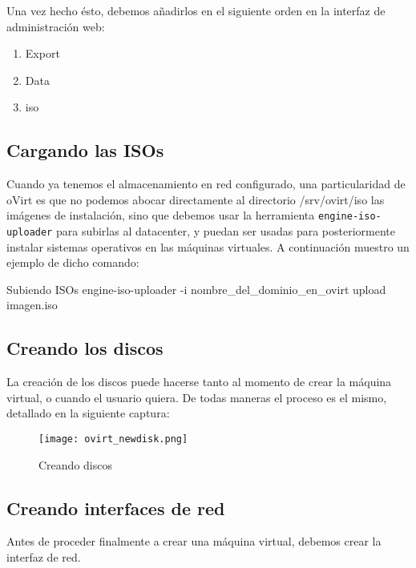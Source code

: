 Una vez hecho ésto, debemos añadirlos en el siguiente orden en la interfaz de administración web:

\begin{enumerate}
    \item Export
    \item Data
    \item iso
\end{enumerate}

\subsection{Cargando las ISOs}
\label{subsec:isos}

Cuando ya tenemos el almacenamiento en red configurado, una particularidad de oVirt es que no podemos abocar directamente al directorio /srv/ovirt/iso las imágenes de instalación, sino que debemos usar la herramienta \texttt{engine-iso-uploader} para subirlas al datacenter, y puedan ser usadas para posteriormente instalar sistemas operativos en las máquinas virtuales. A continuación muestro un ejemplo de dicho comando:

\begin{TMterminal}{}{}{Subiendo ISOs}
  engine-iso-uploader -i nombre_del_dominio_en_ovirt upload imagen.iso
\end{TMterminal}

\subsection{Creando los discos}
\label{subsec:creando_discos}

La creación de los discos puede hacerse tanto al momento de crear la máquina virtual, o cuando el usuario quiera. De todas maneras el proceso es el mismo, detallado en la siguiente captura: 

\begin{figure}[ht!]
  \centering
  \texttt{[image: ovirt\_newdisk.png]}
  \caption{\label{fig:create_disk} Creando discos}
\end{figure}
\clearpage

\subsection{Creando interfaces de red}
\label{subsec:creando_interfaces}

Antes de proceder finalmente a crear una máquina virtual, debemos crear la interfaz de red.

